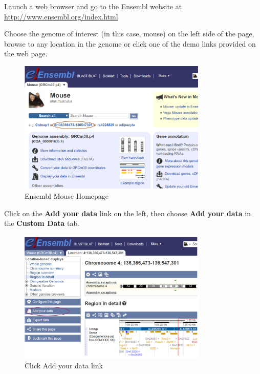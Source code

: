 \begin{steps}
Launch a web browser and go to the Ensembl website at
\url{http://www.ensembl.org/index.html}

Choose the genome of interest (in this case, mouse) on the left side of the
page, browse to any location in the genome or click one of the demo links
provided on the web page.


\begin{figure}[H]
\centering
\includegraphics[width=0.8\textwidth]{MouseHome.png}
\caption{Ensembl Mouse Homepage}
\label{fig:MouseHome}
\end{figure}



Click on the \textbf{Add your data} link on the left, then choose
\textbf{Add your data} in the \textbf{Custom Data} tab.

\begin{figure}[H]
\centering
\includegraphics[width=0.8\textwidth]{AddData.png}
\caption{Click Add your data link}
\label{fig:AddData}
\end{figure}

\end{steps}

